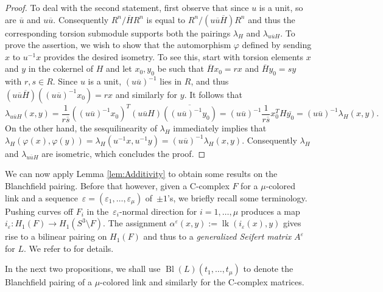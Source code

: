 \documentclass[11pt,a4paper]{amsart}
\theoremstyle{definition}
\newcommand{\eps}{\varepsilon}
\def\op{\operatorname}
\begin{document}
\begin{proof}
To deal with the second statement, first observe that since $u$ is a unit, so are $\overline{u}$ and $u \overline{u}$. Consequently $R^n/\overline{H} R^n$  is equal to $R^n /(u \overline{u}\overline{H}) R^n$ and thus the corresponding torsion submodule supports both the pairings $\lambda_H$ and $\lambda_{u\overline{u}H}$. To prove the assertion, we wish to show that the automorphism $\varphi$ defined by sending $x$ to $u^{-1} x$ provides the desired isometry. To see this, start with torsion elements $x$ and $y$ in the cokernel of $H$ and let $x_0, y_0$ be such that $ \overline{H} x_0=r x$ and $\overline{H}y_0=s y$ with $r,s \in R$.  Since $u$ is a unit, $(u\overline{u})^{-1}$ lies in $R$, and thus $(u \overline{u} \overline{H})((u \overline{u})^{-1} x_0)=r x$ and similarly for $y$. It follows that
$$\lambda_{u \overline{u}H}(x,y)
=\frac{1}{r\overline{s}} ((u \overline{u})^{-1} x_0)^T (u \overline{u} H) \overline{((u \overline{u})^{-1} y_0)} 
=( u \overline{u})^{-1} \frac{1}{r\overline{s}} x_0^T H \overline{y_0}
=( u \overline{u})^{-1} \lambda_H(x,y).
$$
On the other hand, the sesquilinearity of $\lambda_H$ immediately implies that $\lambda_{H} (\varphi(x),\varphi(y))=\lambda_{H} (u^{-1} x,u^{-1} y) =( u \overline{u})^{-1} \lambda_H(x,y)$. Consequently $\lambda_H $ and $\lambda_{u \overline{u} H}$ are isometric, which concludes the proof.
\end{proof}

We can now apply Lemma \ref{lem:Additivity} to obtain some results on the Blanchfield pairing. Before that however, given a C-complex $F$  for a $\mu$-colored link and a sequence~$\eps=(\eps_1,\dots,\eps_\mu)$ of~$\pm 1$'s, we briefly recall some terminology. Pushing curves off $F_i$ in the~$\eps_i$-normal direction for $i=1,\ldots,\mu$ produces a map $i_\varepsilon \colon H_1(F)\to H_1(S^3\setminus F)$. The assignment $\alpha^\varepsilon(x,y):= \op{lk} (i_\eps(x),y)$ gives rise to a bilinear pairing on $H_1(F)$ and thus to a \emph{generalized Seifert matrix} $A^\varepsilon$ for $L$. We refer to \cite{CimasoniPotential, CimasoniFlorens, Cooper} for details.

In the next two propositions, we shall use $\op{Bl}(L)(t_1,\ldots,t_\mu)$ to denote the Blanchfield pairing of a $\mu$-colored link and similarly for the C-complex matrices.
\end{document}

